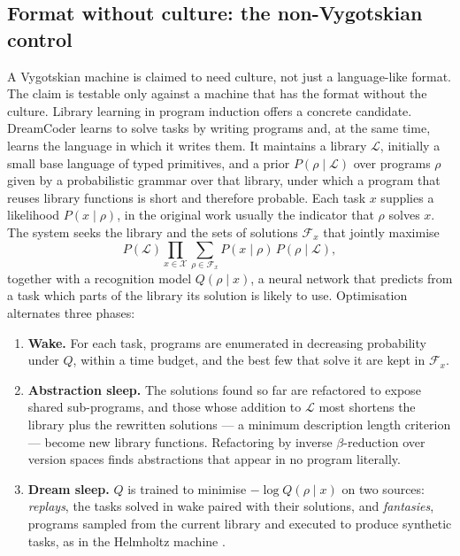 \subsection{Format without culture: the non-Vygotskian control}
\label{sec:inner_speech:library}

A Vygotskian machine is claimed to need culture, not just a language-like format. The claim is testable only against
a machine that has the format without the culture. Library learning in program induction offers a concrete
candidate. DreamCoder \cite{ellis2021dreamcoder} learns to
solve tasks by writing programs and, at the same time, learns the language in which it writes them. It maintains a
library $\mathcal{L}$, initially a small base language of typed primitives, and a prior $P(\rho \mid \mathcal{L})$
over programs $\rho$ given by a probabilistic grammar over that library, under which a program that reuses library
functions is short and therefore probable. Each task $x$ supplies a likelihood $P(x \mid \rho)$, in the original
work usually the indicator that $\rho$ solves $x$. The system seeks the library and the sets of solutions
$\mathcal{F}_x$ that jointly maximise
\begin{equation}
    P(\mathcal{L}) \prod_{x \in \mathcal{X}} \sum_{\rho \in \mathcal{F}_x} P(x \mid \rho)\, P(\rho \mid \mathcal{L}),
    \label{eq:dc_objective}
\end{equation}
together with a recognition model $Q(\rho \mid x)$, a neural network that predicts from a task which parts of the
library its solution is likely to use. Optimisation alternates three phases:
\begin{enumerate}
    \item \textbf{Wake.} For each task, programs are enumerated in decreasing probability under $Q$, within a time
    budget, and the best few that solve it are kept in $\mathcal{F}_x$.
    \item \textbf{Abstraction sleep.} The solutions found so far are refactored to expose shared sub-programs, and
    those whose addition to $\mathcal{L}$ most shortens the library plus the rewritten solutions --- a minimum
    description length criterion --- become new library functions. Refactoring by inverse $\beta$-reduction over
    version spaces finds abstractions that appear in no program literally.
    \item \textbf{Dream sleep.} $Q$ is trained to minimise $-\log Q(\rho \mid x)$ on two sources: \emph{replays}, the
    tasks solved in wake paired with their solutions, and \emph{fantasies}, programs sampled from the current
    library and executed to produce synthetic tasks, as in the Helmholtz machine \cite{dayan1995helmholtz}.
\end{enumerate}
